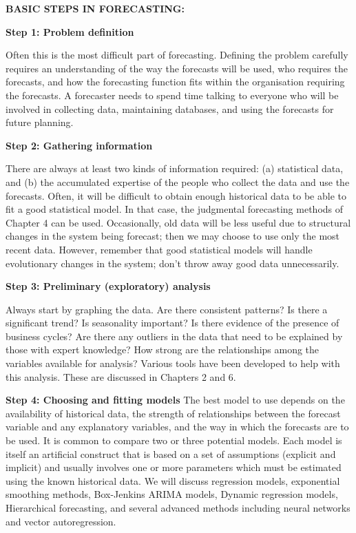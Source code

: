 \documentclass[12pt,openany]{book}
\begin{document}
\textbf{BASIC STEPS IN FORECASTING:}

\textbf{Step 1: Problem definition}

Often this is the most difficult part of forecasting. Defining the problem carefully requires an understanding of the way the forecasts will be used, who requires the forecasts, and how the forecasting function fits within the organisation requiring the forecasts. A forecaster needs to spend time talking to everyone who will be involved in collecting data, maintaining databases, and using the forecasts for future planning.

\textbf{Step 2: Gathering information}

There are always at least two kinds of information required: (a) statistical data, and (b) the accumulated expertise of the people who collect the data and use the forecasts. Often, it will be difficult to obtain enough historical data to be able to fit a good statistical model. In that case, the judgmental forecasting methods of Chapter 4 can be used. Occasionally, old data will be less useful due to structural changes in the system being forecast; then we may choose to use only the most recent data. However, remember that good statistical models will handle evolutionary changes in the system; don't throw away good data unnecessarily.

\textbf{Step 3: Preliminary (exploratory) analysis}

Always start by graphing the data. Are there consistent patterns? Is there a significant trend? Is seasonality important? Is there evidence of the presence of business cycles? Are there any outliers in the data that need to be explained by those with expert knowledge? How strong are the relationships among the variables available for analysis? Various tools have been developed to help with this analysis. These are discussed in Chapters 2 and 6.

\textbf{Step 4: Choosing and fitting models}
The best model to use depends on the availability of historical data, the strength of relationships between the forecast variable and any explanatory variables, and the way in which the forecasts are to be used. It is common to compare two or three potential models. Each model is itself an artificial construct that is based on a set of assumptions (explicit and implicit) and usually involves one or more parameters which must be estimated using the known historical data. We will discuss regression models, exponential smoothing methods, Box-Jenkins ARIMA models, Dynamic regression models, Hierarchical forecasting, and several advanced methods including neural networks and vector autoregression.
\end{document}
